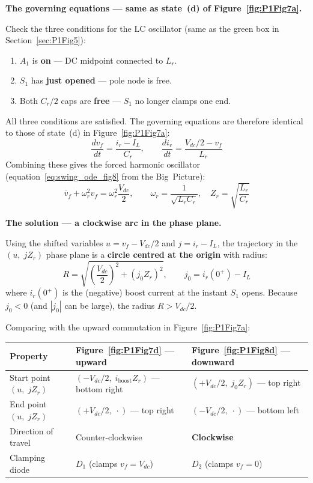 \documentclass[12pt, a4paper]{article}
\def\,{ }%
\newcommand{\Vdc}{V_{dc}}
\newcommand{\vf}{v_f}
\newcommand{\ir}{i_r}
\newcommand{\IL}{I_L}
\newcommand{\Lr}{L_r}
\newcommand{\Cr}{C_r}
\newcommand{\omegar}{\omega_r}
\newcommand{\Zr}{Z_r}
\newcommand{\figref}[1]{Figure~\ref{#1}}
\begin{document}
\medskip
\textbf{The governing equations --- same as state~(d) of
\figref{fig:P1Fig7a}.}

Check the three conditions for the LC oscillator (same as the
green box in Section~\ref{sec:P1Fig5}):
\begin{enumerate}
    \item $A_1$ is \textbf{on} --- DC midpoint connected to $\Lr$.
          \checkmark
    \item $S_1$ has \textbf{just opened} --- pole node is free.
          \checkmark
    \item Both $\Cr/2$ caps are \textbf{free} --- $S_1$ no longer
          clamps one end. \checkmark
\end{enumerate}
All three conditions are satisfied.
The governing equations are therefore identical to those of state~(d)
in \figref{fig:P1Fig7a}:
\begin{equation}
    \frac{d\vf}{dt} = \frac{\ir - \IL}{\Cr},
    \qquad
    \frac{d\ir}{dt} = \frac{\Vdc/2 - \vf}{\Lr}
    \label{eq:swing_odes_fig8}
\end{equation}
Combining these gives the forced harmonic oscillator
(equation~\eqref{eq:swing_ode_fig8} from the Big~Picture):
\begin{equation*}
    \ddot{\vf} + \omegar^2\,\vf = \omegar^2\,\frac{\Vdc}{2},
    \qquad \omegar = \frac{1}{\sqrt{\Lr\Cr}},
    \quad \Zr = \sqrt{\frac{\Lr}{\Cr}}
\end{equation*}

\medskip
\textbf{The solution --- a clockwise arc in the phase plane.}

Using the shifted variables $u = \vf - \Vdc/2$ and $j = \ir - \IL$,
the trajectory in the $(u,\; j\Zr)$ phase plane is a
\textbf{circle centred at the origin} with radius:
\begin{equation}
    R = \sqrt{\left(\frac{\Vdc}{2}\right)^{\!2} + (j_0\Zr)^2},
    \qquad j_0 = \ir(0^+) - \IL
    \label{eq:R_fig8}
\end{equation}
where $\ir(0^+)$ is the (negative) boost current at the instant $S_1$
opens.
Because $j_0 < 0$ (and $|j_0|$ can be large), the radius $R > \Vdc/2$.

Comparing with the upward commutation in \figref{fig:P1Fig7a}:

\begin{center}
\renewcommand{\arraystretch}{1.3}
\begin{tabular}{p{3.5cm} p{4.7cm} p{4.7cm}}
\toprule
\textbf{Property} & \textbf{\figref{fig:P1Fig7d} --- upward}
                  & \textbf{\figref{fig:P1Fig8d} --- downward} \\
\midrule
Start point $(u,\;j\Zr)$
    & $(-\Vdc/2,\;i_\text{boost}\Zr)$ --- bottom right
    & $(+\Vdc/2,\;j_0\Zr)$ --- top right \\
End point $(u,\;j\Zr)$
    & $(+\Vdc/2,\;\cdot)$ --- top right
    & $(-\Vdc/2,\;\cdot)$ --- bottom left \\
Direction of travel & Counter-clockwise & \textbf{Clockwise} \\
Clamping diode & $D_1$ (clamps $\vf = \Vdc$) & $D_2$ (clamps $\vf = 0$) \\
\bottomrule
\end{tabular}
\end{center}
\end{document}
